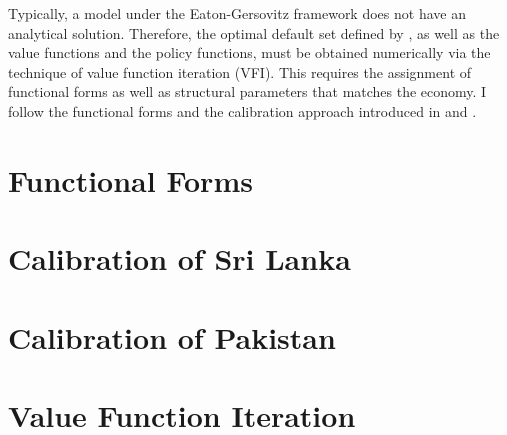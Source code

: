 Typically, a model under the Eaton-Gersovitz framework does not have an analytical solution. Therefore, the optimal default set defined by , as well as the value functions and the policy functions, must be obtained numerically via the technique of value function iteration (VFI).
This requires the assignment of functional forms as well as structural parameters that matches the economy.
I follow the functional forms and the calibration approach introduced in \citet{Na-18} and \citet{Hinrichsen_2020-chapter4}.

\section*{Functional Forms}


\section*{Calibration of Sri Lanka}


\section*{Calibration of Pakistan}


\section*{Value Function Iteration}
